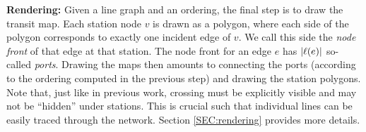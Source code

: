 \documentclass{llncs}
\begin{document}
%

\smallskip\noindent
{\bf Rendering:}
Given a line graph and an ordering, the final step is to draw the transit map.
Each station node $v$ is drawn as a polygon, where each side of the polygon corresponds to exactly one incident edge of $v$.
We call this side the \emph{node front} of that edge at that station.
The node front for an edge $e$ has $|\ell(e)|$ so-called \emph{ports}.
Drawing the maps then amounts to connecting the ports (according to the ordering computed in the previous step) and drawing the station polygons.
Note that, just like in previous work, crossing must be explicitly visible and may not be ``hidden'' under stations.
This is crucial such that individual lines can be easily traced through the network.
Section \ref{SEC:rendering} provides more details.

\end{document}
